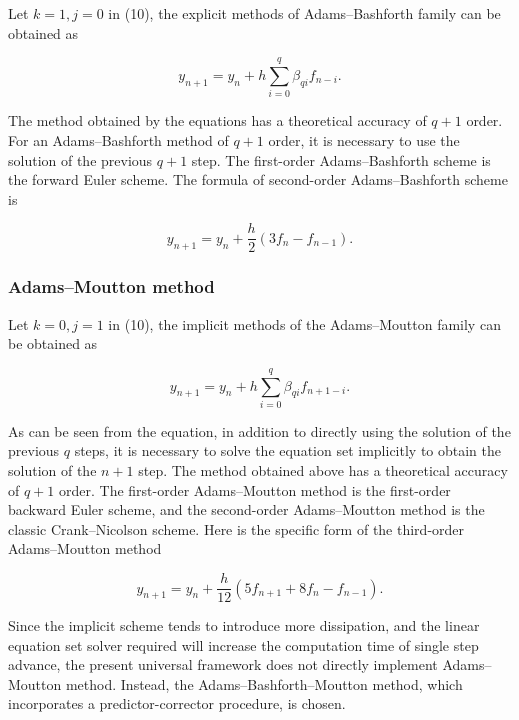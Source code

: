 \documentclass{article}
\begin{document}
Let $k=1, j=0$ in (10), the explicit methods of Adams--Bashforth family can be obtained as

\begin{equation}
  y_{n+1} = y_n + h \sum_{i=0}^q \beta_{qi} f_{n-i}.
\end{equation}

The method obtained by the equations has a theoretical accuracy of $q+1$ order. For an Adams--Bashforth method of $q+1$ order, it is necessary to use the solution of the previous $q+1$ step. The first-order Adams--Bashforth scheme is the forward Euler scheme. The formula of second-order Adams--Bashforth scheme is

\begin{equation}
\label{eq:AB2}
  y_{n+1} = y_n + \frac{h}{2}(3f_n - f_{n-1}).
\end{equation}


\subsubsection{Adams--Moutton method}

Let $k=0, j=1$ in (10), the implicit methods of the Adams--Moutton family can be obtained as

\begin{equation}
  y_{n+1} = y_n + h \sum_{i=0}^q \beta_{qi} f_{n+1-i}.
\end{equation}

As can be seen from the equation, in addition to directly using the solution of the previous $q$ steps, it is necessary to solve the equation set implicitly to obtain the solution of the $n+1$ step. The method obtained above has a theoretical accuracy of $q+1$ order. The first-order Adams--Moutton method is the first-order backward Euler scheme, and the second-order Adams--Moutton method is the classic Crank--Nicolson scheme. Here is the specific form of the third-order Adams--Moutton method

\begin{equation}
\label{eq:AM3}
  y_{n+1} = y_n + \frac{h}{12}(5f_{n+1} + 8 f_n - f_{n-1}).
\end{equation}

Since the implicit scheme tends to introduce more dissipation, and the linear equation set solver required will increase the computation time of single step advance, the present universal framework does not directly implement Adams--Moutton method. Instead, the Adams--Bashforth--Moutton method, which incorporates a predictor-corrector procedure, is chosen.
\end{document}
